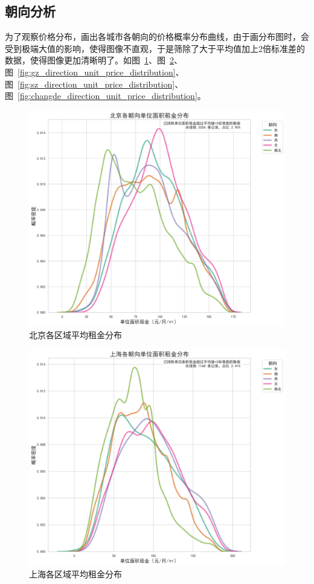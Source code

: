 \subsection{朝向分析}
为了观察价格分布，画出各城市各朝向的价格概率分布曲线，由于画分布图时，会受到极端大值的影响，使得图像不直观，于是筛除了大于平均值加上2倍标准差的数据，使得图像更加清晰明了。如图~\ref{fig:bj_direction_unit_price_distribution}、图~\ref{fig:sh_direction_unit_price_distribution}、图~\ref{fig:gz_direction_unit_price_distribution}、图~\ref{fig:sz_direction_unit_price_distribution}、图~\ref{fig:changde_direction_unit_price_distribution}。
\begin{figure}[htbp]
    \centering
    \includegraphics[width=0.7\linewidth]{../../figure/bj_direction_unit_price_distribution.png}
    \caption{北京各区域平均租金分布}
    \label{fig:bj_direction_unit_price_distribution}
\end{figure}
\begin{figure}[htbp]
    \centering
    \includegraphics[width=0.7\linewidth]{../../figure/sh_direction_unit_price_distribution.png}
    \caption{上海各区域平均租金分布}
    \label{fig:sh_direction_unit_price_distribution}
\end{figure}
